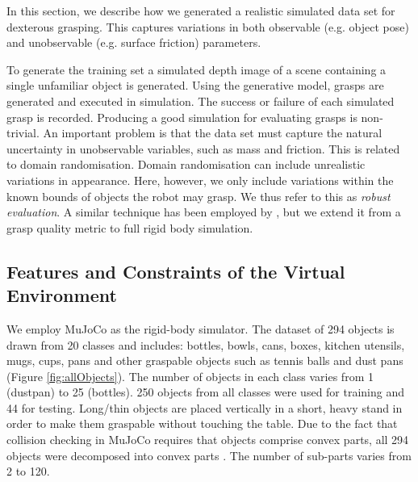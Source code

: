 In this section, we describe how we generated a realistic simulated data set for dexterous grasping. This captures variations in both observable (e.g. object pose) and unobservable (e.g. surface friction) parameters.

To generate the training set a simulated depth image of a scene containing a single unfamiliar object is generated. Using the generative model, grasps are generated and executed in simulation. The success or failure of each simulated grasp is recorded. Producing a good simulation for evaluating grasps is non-trivial. An important problem is that the data set must capture the natural uncertainty in unobservable variables, such as mass and friction. This is related to domain randomisation. Domain randomisation can include unrealistic variations in appearance. Here, however, we only include variations within the known bounds of objects the robot may grasp. We thus refer to this as {\em robust evaluation}. A similar technique has been employed by \cite{mahler2017dex}, but we extend it from a grasp quality metric to full rigid body simulation.

\subsection{Features and Constraints of the Virtual Environment}
\label{subsection:environment}

We employ MuJoCo \cite{MuJoCo} as the rigid-body simulator. The dataset of 294 objects is drawn from 20 classes and includes: bottles, bowls, cans, boxes, kitchen utensils, mugs, cups, pans and other graspable objects such as tennis balls and dust pans (Figure \ref{fig:allObjects}). The number of objects in each class varies from 1 (dustpan) to 25 (bottles). 250 objects from all classes were used for training and 44 for testing. Long/thin objects are placed vertically in a short, heavy stand in order to make them graspable without touching the table. Due to the fact that collision checking in MuJoCo requires that objects comprise convex parts, all 294 objects were decomposed into convex parts \cite{V-HACD}. The number of sub-parts varies from 2 to 120. 

